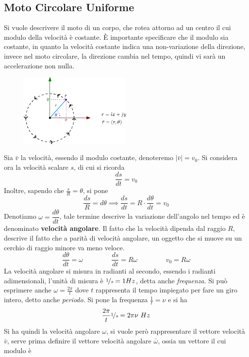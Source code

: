 \documentclass[10pt, letterpaper]{report}
\begin{document}
\subsection{Moto Circolare Uniforme}
Si vuole descrivere il moto di un corpo, che rotea attorno ad un centro il cui modulo della 
velocità è costante. È importante specificare che il modulo sia costante, in quanto la velocità 
costante indica una non-variazione della direzione, invece nel moto circolare, la direzione 
cambia nel tempo, quindi vi sarà un accelerazione non nulla.\begin{center}
    \begin{figure}[h!]
        \centering
        \includegraphics[width=0.5\textwidth]{images/motoCircUn.eps}
    \end{figure} 
\end{center}
Sia $\bar v$ la velocità, essendo il modulo costante, denoteremo $|\bar v|=v_0$. Si considera ora 
la velocità scalare $s$, di cui si ricorda 
$$ \frac{ds}{dt}=v_0$$
Inoltre, sapendo che $\frac{s}{R}=\theta$, si pone 
$$ \frac{ds}{R}=d\theta \implies \frac{ds}{dt}=R\cdot \frac{d\theta}{dt}=v_0$$
Denotiamo $\omega = \dfrac{d\theta}{dt}$, tale termine descrive la variazione dell'angolo nel tempo 
ed è denominato \textbf{velocità angolare}. Il fatto che la velocità dipenda dal raggio $R$, descrive il fatto 
che a parità di velocità angolare, un oggetto che si muove su un cerchio di raggio minore va meno veloce. 
$$ \frac{d\theta}{dt}=\omega \;\;\;\;\;\;\;\;\;\;\;\;\;\;\;
\frac{ds}{dt}=R\omega \;\;\;\;\; \;\;\;\;\;\;\;\;\;\;
v_0=R\omega$$
La velocità angolare si misura in radianti al secondo, essendo i radianti adimensionali, l'unità 
di misura è $\nicefrac{1}{s}=1 Hz$, detta anche \textit{frequenza}. Si può esprimere 
anche $\omega=\frac{2\pi}{t}$ dove $t$ rappresenta il tempo impiegato per fare un giro intero, 
detto anche \textit{periodo}. Si pone  la frequenza $\frac{1}{t}=\nu$ e si ha 
$$\frac{2\pi}{t} \nicefrac{1}{s}=2\pi\nu\ Hz$$
Si ha quindi la velocità angolare $\omega$, si vuole però rappresentare il vettore 
velocità $\bar v$, serve prima definire il vettore velocità angolare $\bar \omega$, ossia un vettore il cui modulo è 
\end{document}
